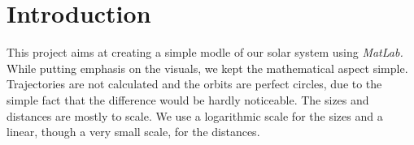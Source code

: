 \chapter{Introduction}
This project aims at creating a simple modle of our solar system using {\em MatLab.} While putting emphasis on the visuals, we kept the mathematical aspect simple.\\

Trajectories are not calculated and the orbits are perfect circles, due to the simple fact that the difference would be hardly noticeable. The sizes and distances are mostly to scale. We use a logarithmic scale for the sizes and a linear, though a very small scale, for the distances. 
\pagebreak